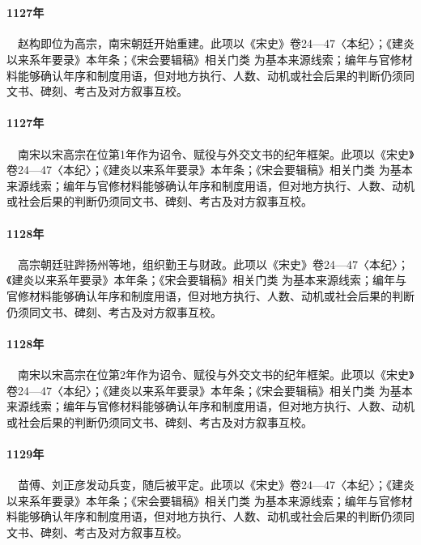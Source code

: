 \section{}

\paragraph{1127年}　赵构即位为高宗，南宋朝廷开始重建。此项以《宋史》卷24—47〈本纪〉；《建炎以来系年要录》本年条；《宋会要辑稿》相关门类 为基本来源线索；编年与官修材料能够确认年序和制度用语，但对地方执行、人数、动机或社会后果的判断仍须同文书、碑刻、考古及对方叙事互校。

\paragraph{1127年}　南宋以宋高宗在位第1年作为诏令、赋役与外交文书的纪年框架。此项以《宋史》卷24—47〈本纪〉；《建炎以来系年要录》本年条；《宋会要辑稿》相关门类 为基本来源线索；编年与官修材料能够确认年序和制度用语，但对地方执行、人数、动机或社会后果的判断仍须同文书、碑刻、考古及对方叙事互校。

\paragraph{1128年}　高宗朝廷驻跸扬州等地，组织勤王与财政。此项以《宋史》卷24—47〈本纪〉；《建炎以来系年要录》本年条；《宋会要辑稿》相关门类 为基本来源线索；编年与官修材料能够确认年序和制度用语，但对地方执行、人数、动机或社会后果的判断仍须同文书、碑刻、考古及对方叙事互校。

\paragraph{1128年}　南宋以宋高宗在位第2年作为诏令、赋役与外交文书的纪年框架。此项以《宋史》卷24—47〈本纪〉；《建炎以来系年要录》本年条；《宋会要辑稿》相关门类 为基本来源线索；编年与官修材料能够确认年序和制度用语，但对地方执行、人数、动机或社会后果的判断仍须同文书、碑刻、考古及对方叙事互校。

\paragraph{1129年}　苗傅、刘正彦发动兵变，随后被平定。此项以《宋史》卷24—47〈本纪〉；《建炎以来系年要录》本年条；《宋会要辑稿》相关门类 为基本来源线索；编年与官修材料能够确认年序和制度用语，但对地方执行、人数、动机或社会后果的判断仍须同文书、碑刻、考古及对方叙事互校。

